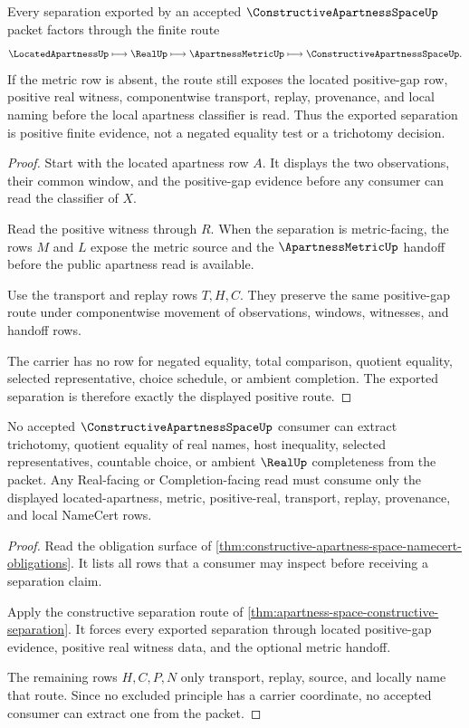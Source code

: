 \begin{theorem}
\label{thm:apartness-space-constructive-separation}
Every separation exported by an accepted $\ConstructiveApartnessSpaceUp$ packet factors through the finite route
$$
\LocatedApartnessUp \longmapsto \RealUp \longmapsto \ApartnessMetricUp \longmapsto \ConstructiveApartnessSpaceUp .
$$
If the metric row is absent, the route still exposes the located positive-gap row, positive real witness, componentwise transport, replay, provenance, and local naming before the local apartness classifier is read. Thus the exported separation is positive finite evidence, not a negated equality test or a trichotomy decision.
\end{theorem}
\begin{proof}
Start with the located apartness row $A$. It displays the two observations, their common window, and the positive-gap evidence before any consumer can read the classifier of $X$.

Read the positive witness through $R$. When the separation is metric-facing, the rows $M$ and $L$ expose the metric source and the $\ApartnessMetricUp$ handoff before the public apartness read is available.

Use the transport and replay rows $T,H,C$. They preserve the same positive-gap route under componentwise movement of observations, windows, witnesses, and handoff rows.

The carrier has no row for negated equality, total comparison, quotient equality, selected representative, choice schedule, or ambient completion. The exported separation is therefore exactly the displayed positive route.
\end{proof}

\begin{theorem}
\label{thm:apartness-space-nonescape}
No accepted $\ConstructiveApartnessSpaceUp$ consumer can extract trichotomy, quotient equality of real names, host inequality, selected representatives, countable choice, or ambient $\RealUp$ completeness from the packet. Any Real-facing or Completion-facing read must consume only the displayed located-apartness, metric, positive-real, transport, replay, provenance, and local NameCert rows.
\end{theorem}
\begin{proof}
Read the obligation surface of \autoref{thm:constructive-apartness-space-namecert-obligations}. It lists all rows that a consumer may inspect before receiving a separation claim.

Apply the constructive separation route of \autoref{thm:apartness-space-constructive-separation}. It forces every exported separation through located positive-gap evidence, positive real witness data, and the optional metric handoff.

The remaining rows $H,C,P,N$ only transport, replay, source, and locally name that route. Since no excluded principle has a carrier coordinate, no accepted consumer can extract one from the packet.
\end{proof}

